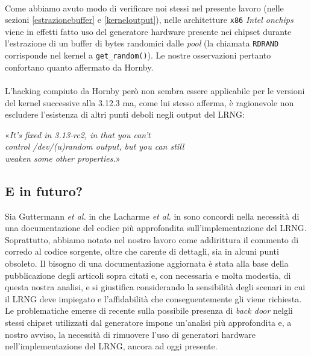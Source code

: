 \documentclass{article}
\begin{document}
 \paragraph{}Come abbiamo avuto modo di verificare noi
 stessi nel presente lavoro (nelle sezioni \ref{estrazionebuffer} e 
 \ref{kerneloutput}), nelle architetture \verb+x86+ \emph{Intel onchips} viene
 in effetti fatto uso del generatore hardware presente nei chipset durante
 l'estrazione di un buffer di bytes randomici dalle \emph{pool} (la
 chiamata \verb+RDRAND+ corrisponde nel kernel a \verb+get_random()+).
 Le nostre osservazioni pertanto confortano quanto affermato da Hornby.
 \paragraph{}L'hacking compiuto da Hornby però non sembra essere applicabile per
 le versioni del kernel successive alla 3.12.3 ma, come lui stesso afferma, è
 ragionevole non escludere l'esistenza di altri punti deboli negli output del
 LRNG:
 \begin{center}
 «\emph{It's fixed in 3.13-rc2, in that you can't \\
 control /dev/(u)random output, but you can still \\
 weaken some other properties.}»
 \end{center}
 
 \subsection{E in futuro?}
 Sia Guttermann \emph{et al.} in \cite{gutt} che Lacharme \emph{et al.} in
 \cite{lach} sono concordi nella necessità di una documentazione del codice più
 approfondita sull'implementazione del LRNG. Soprattutto, abbiamo notato
 nel nostro lavoro come addirittura il commento di corredo al codice sorgente, oltre
 che carente di dettagli, sia in alcuni punti obsoleto. Il bisogno di una
 documentazione aggiornata è stata alla base della pubblicazione degli articoli
 sopra citati e, con necessaria e molta modestia, di questa nostra analisi, e si
 giustifica considerando la sensibilità degli scenari in cui il LRNG deve
 impiegato e l'affidabilità che conseguentemente gli viene richiesta.
 Le problematiche emerse di recente sulla possibile presenza di \emph{back door}
 nelgli stessi chipset utilizzati dal generatore impone un'analisi più
 approfondita e, a nostro avviso, la necessità di rimuovere l'uso
 di generatori hardware nell'implementazione del LRNG, ancora ad oggi presente.
 
\end{document}
